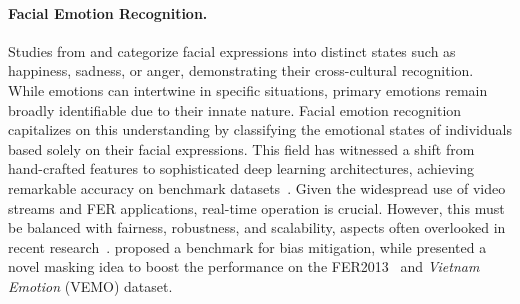 \paragraph{Facial Emotion Recognition.}
Studies from \citet{ekman1971constants} and \citet{LiD22a} categorize facial expressions into distinct states 
such as happiness, sadness, or anger, 
demonstrating their cross-cultural recognition. 
While emotions can intertwine in specific situations, 
primary emotions remain broadly identifiable due to their innate nature.
Facial emotion recognition capitalizes on this understanding by classifying the emotional states of individuals based solely on their facial expressions. 
This field has witnessed a shift from hand-crafted features to sophisticated deep learning architectures, 
achieving remarkable accuracy on benchmark datasets~\cite{FardM22,LiGL22}. 
Given the widespread use of video streams and FER applications, 
real-time operation is crucial. 
However, 
this must be balanced with fairness, robustness, and scalability, 
aspects often overlooked in recent research~\cite{Savchenko22}. 
\citet{WangQKGNHR20} proposed a benchmark for bias mitigation, 
while \citet{PhamVT20} presented a novel masking idea to boost the performance on the FER2013~\cite{BarsoumZCZ16} and \textit{Vietnam Emotion} (VEMO) dataset. 


